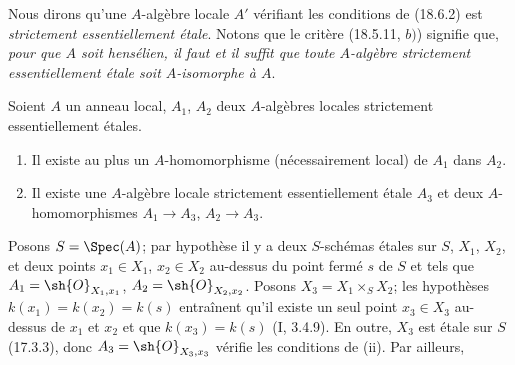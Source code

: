 Nous dirons qu'une $A$-algèbre locale $A'$ vérifiant les conditions de (18.6.2) est \emph{strictement essentiellement étale}. Notons que le critère (18.5.11, $b)$) signifie que, \emph{pour que $A$ soit hensélien, il faut et il suffit que toute $A$-algèbre strictement essentiellement étale soit $A$-isomorphe à $A$}.

\begin{lemma}[18.6.3]
\label{IV.18.6.3}
Soient $A$ un anneau local, $A_1$, $A_2$ deux $A$-algèbres locales strictement essentiellement étales.
\begin{enumerate}
  \item[(i)] Il existe au plus un $A$-homomorphisme (nécessairement local) de $A_1$ dans $A_2$.
  \item[(ii)] Il existe une $A$-algèbre locale strictement essentiellement étale $A_3$ et deux $A$-homomorphismes $A_1\to A_3$, $A_2\to A_3$.
\end{enumerate}
\end{lemma}

Posons $S=\Spec(A)$; par hypothèse il y a deux $S$-schémas étales sur $S$, $X_1$, $X_2$, et deux points $x_1\in X_1$, $x_2\in X_2$ au-dessus du point fermé $s$ de $S$ et tels que $A_1=\sh{O}_{X_1,x_1}$, $A_2=\sh{O}_{X_2,x_2}$. Posons $X_3=X_1\times_S X_2$; les hypothèses $k(x_1)=k(x_2)=k(s)$ entraînent qu'il existe un seul point $x_3\in X_3$ au-dessus de $x_1$ et $x_2$ et que $k(x_3)=k(s)$ (I, 3.4.9). En outre, $X_3$ est étale sur $S$ (17.3.3), donc $A_3=\sh{O}_{X_3,x_3}$ vérifie les conditions de (ii). Par ailleurs,

